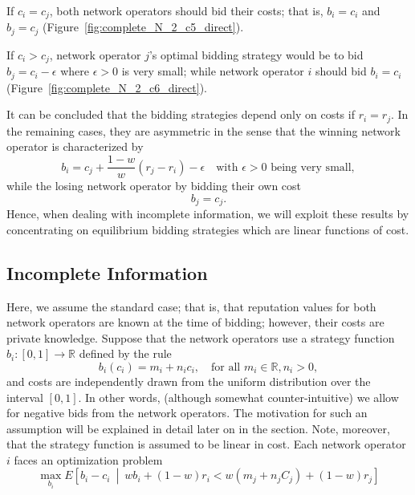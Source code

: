 If $c_i = c_j$, both network operators should bid their costs; that is, $b_i = c_i$ and $b_j = c_j$ (Figure~\ref{fig:complete_N_2_c5_direct}).

If $c_i > c_j$, network operator $j$'s optimal bidding strategy would be to bid $b_j = c_i - \epsilon$ where $\epsilon>0$ is very small; while network operator $i$ should bid $b_i = c_i$ (Figure~\ref{fig:complete_N_2_c6_direct}).

It can be concluded that the bidding strategies depend only on costs if $r_i = r_j$. In the remaining cases, they are asymmetric in the sense that the winning network operator is characterized by
\begin{equation*}
	b_i = c_j + \frac{1-w}{w}(r_j - r_i) - \epsilon \quad\text{with }\epsilon>0\text{ being very small},
\end{equation*}
while the losing network operator by bidding their own cost
\begin{equation*}
	b_j = c_j.
\end{equation*}
Hence, when dealing with incomplete information, we will exploit these results by concentrating on equilibrium bidding strategies which are linear functions of cost.

\subsection{Incomplete Information} %
\label{sub:incomplete_information_n_2_direct}
Here, we assume the standard case; that is, that reputation values for both network operators are known at the time of bidding; however, their costs are private knowledge. Suppose that the network operators use a strategy function $b_i: [0,1]\to\mathbb{R}$ defined by the rule
\begin{equation}
	\label{eq:pcomp_bidding_str_direct}
	b_i(c_i) = m_i + n_i c_i,\quad\text{for all } m_i\in\mathbb{R},n_i>0,
\end{equation}
and costs are independently drawn from the uniform distribution over the interval $[0,1]$. In other words, (although somewhat counter-intuitive) we allow for negative bids from the network operators. The motivation for such an assumption will be explained in detail later on in the section. Note, moreover, that the strategy function is assumed to be linear in cost. Each network operator $i$ faces an optimization problem
\begin{equation}
	\label{eq:pcomp_exp_utility_uc_direct}
	\max_{b_i}E \left[ b_i-c_i \:\middle\vert\: wb_i + (1-w)r_i < w(m_j + n_j C_j) + (1-w)r_j\right]
\end{equation}

